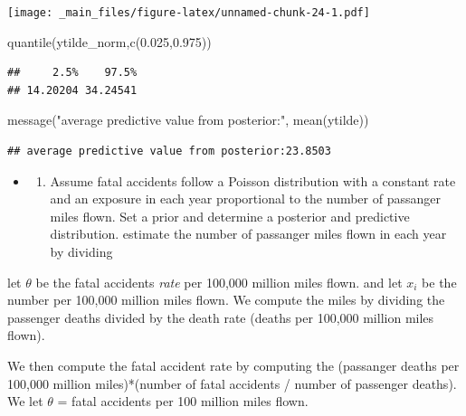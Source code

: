 \documentclass[
]{book}
\newenvironment{Shaded}{\begin{snugshade}}{\end{snugshade}}
\newcommand{\FloatTok}[1]{\textcolor[rgb]{0.00,0.00,0.81}{#1}}
\newcommand{\FunctionTok}[1]{\textcolor[rgb]{0.00,0.00,0.00}{#1}}
\newcommand{\NormalTok}[1]{#1}
\newcommand{\StringTok}[1]{\textcolor[rgb]{0.31,0.60,0.02}{#1}}
\providecommand{\tightlist}{%
  \setlength{\itemsep}{0pt}\setlength{\parskip}{0pt}}
\theoremstyle{definition}
\theoremstyle{definition}
\theoremstyle{definition}
\theoremstyle{definition}
\theoremstyle{remark}
\begin{document}
\texttt{[image: \_main\_files/figure-latex/unnamed-chunk-24-1.pdf]}

\begin{Shaded}
\begin{Highlighting}[]
 \FunctionTok{quantile}\NormalTok{(ytilde\_norm,}\FunctionTok{c}\NormalTok{(}\FloatTok{0.025}\NormalTok{,}\FloatTok{0.975}\NormalTok{))}
\end{Highlighting}
\end{Shaded}

\begin{verbatim}
##     2.5%    97.5% 
## 14.20204 34.24541
\end{verbatim}

\begin{Shaded}
\begin{Highlighting}[]
 \FunctionTok{message}\NormalTok{(}\StringTok{"average predictive value from posterior:"}\NormalTok{, }\FunctionTok{mean}\NormalTok{(ytilde))}
\end{Highlighting}
\end{Shaded}

\begin{verbatim}
## average predictive value from posterior:23.8503
\end{verbatim}

\begin{itemize}
\item
  \begin{enumerate}
  \def\labelenumi{(\alph{enumi})}
  \setcounter{enumi}{1}
  \tightlist
  \item
    Assume fatal accidents follow a Poisson distribution with a constant rate and an exposure in each year proportional to the number of passanger miles flown. Set a prior and determine a posterior and predictive distribution. estimate the number of passanger miles flown in each year by dividing
  \end{enumerate}
\end{itemize}

let \(\theta\) be the fatal accidents \emph{rate} per 100,000 million miles flown. and let \(x_i\) be the number per 100,000 million miles flown. We compute the miles by dividing the passenger deaths divided by the death rate (deaths per 100,000 million miles flown).

We then compute the fatal accident rate by computing the (passanger deaths per 100,000 million miles)*(number of fatal accidents / number of passenger deaths). We let \(\theta\) = fatal accidents per 100 million miles flown.
\end{document}
